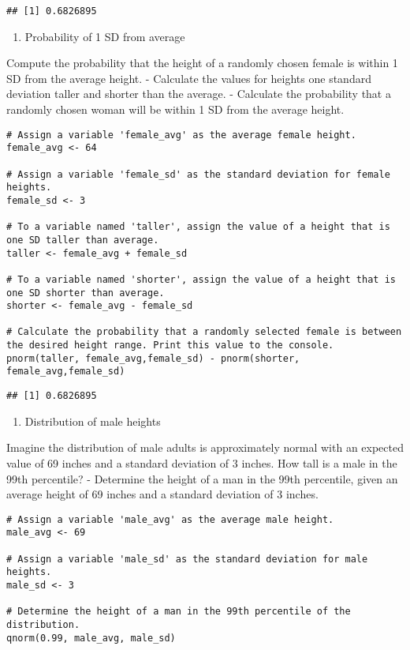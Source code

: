 \documentclass[
]{article}
\providecommand{\tightlist}{%
  \setlength{\itemsep}{0pt}\setlength{\parskip}{0pt}}
\begin{document}
\begin{verbatim}
## [1] 0.6826895
\end{verbatim}

\begin{enumerate}
\def\labelenumi{\arabic{enumi}.}
\setcounter{enumi}{4}
\tightlist
\item
  Probability of 1 SD from average
\end{enumerate}

Compute the probability that the height of a randomly chosen female is
within 1 SD from the average height. - Calculate the values for heights
one standard deviation taller and shorter than the average. - Calculate
the probability that a randomly chosen woman will be within 1 SD from
the average height.

\begin{verbatim}
# Assign a variable 'female_avg' as the average female height.
female_avg <- 64

# Assign a variable 'female_sd' as the standard deviation for female heights.
female_sd <- 3

# To a variable named 'taller', assign the value of a height that is one SD taller than average.
taller <- female_avg + female_sd

# To a variable named 'shorter', assign the value of a height that is one SD shorter than average.
shorter <- female_avg - female_sd

# Calculate the probability that a randomly selected female is between the desired height range. Print this value to the console.
pnorm(taller, female_avg,female_sd) - pnorm(shorter, female_avg,female_sd)
\end{verbatim}

\begin{verbatim}
## [1] 0.6826895
\end{verbatim}

\begin{enumerate}
\def\labelenumi{\arabic{enumi}.}
\setcounter{enumi}{5}
\tightlist
\item
  Distribution of male heights
\end{enumerate}

Imagine the distribution of male adults is approximately normal with an
expected value of 69 inches and a standard deviation of 3 inches. How
tall is a male in the 99th percentile? - Determine the height of a man
in the 99th percentile, given an average height of 69 inches and a
standard deviation of 3 inches.

\begin{verbatim}
# Assign a variable 'male_avg' as the average male height.
male_avg <- 69

# Assign a variable 'male_sd' as the standard deviation for male heights.
male_sd <- 3

# Determine the height of a man in the 99th percentile of the distribution.
qnorm(0.99, male_avg, male_sd)
\end{verbatim}
\end{document}
